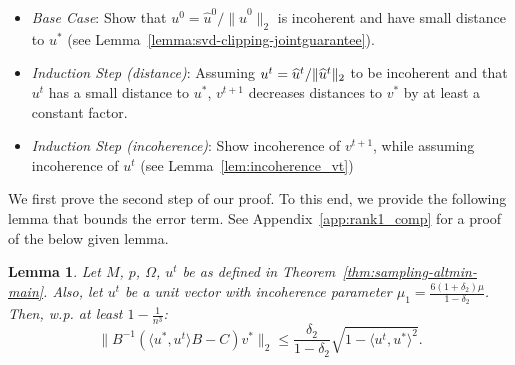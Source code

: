 \documentclass[11pt]{article}
\renewcommand{\eqref}[1]{\hyperref[#1]{(\ref*{#1})}}
\theoremstyle{plain}
\newtheorem{lemma}[theorem]{Lemma}
\theoremstyle{definition}
\newcommand{\vto}{v^{t+1}}
\newcommand{\ut}{u^t}
\newcommand{\uo}{u^* }
\newcommand{\vo}{v^* }
\newcommand{\ip}[2]{\langle #1, #2 \rangle}
\newcommand{\vt}{\vto}
\begin{document}
\begin{itemize}\setlength{\topsep}{-5pt}\setlength{\itemsep}{-5pt}
\item {\em Base Case}: Show that $u^0=\widehat{u}^0/\|\widehat{u}^0\|_2$ is incoherent and have small distance to $\uo$ (see Lemma~\ref{lemma:svd-clipping-jointguarantee}).  
\item {\em Induction Step (distance)}: Assuming $\ut=\widehat{u}^t/\|\uht\|_2$ to be incoherent and that $\ut$ has a small distance to $\uo$, $\vt$ decreases distances to $\vo$ by at least a constant factor. 
\item {\em Induction Step (incoherence)}: Show incoherence of $\vt$, while assuming incoherence of $\ut$ (see Lemma~\ref{lem:incoherence_vt})
\end{itemize}
We first prove the second step of our proof. To this end, we provide the following lemma that bounds the error term. See Appendix~\ref{app:rank1_comp} for a proof of the below given lemma. 
\begin{lemma}\label{lem:errb_comp1}
Let $M$, $p$, $\Omega$, $\ut$ be as defined in Theorem~\ref{thm:sampling-altmin-main}. Also, let $\ut$ be a unit vector with incoherence parameter $\mu_1=\frac{6(1+\delta_2)\mu}{1-\delta_2}$.%
Then, w.p. at least $1-\frac{1}{n^3}$: 
$$\|B^{-1}\left(\ip{\uo}{\ut}B-C\right)\vo\|_2\leq \frac{\delta_{2}}{1-\delta_{2}}\sqrt{1-\ip{\ut}{\uo}^2}.$$
\end{lemma}

\end{document}
